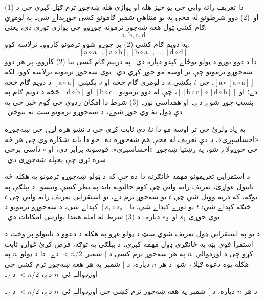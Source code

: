 \documentclass[../../../include/open-logic-section]{subfiles}
\begin{document}
دا تعريف راته وايي چې يو څيز هله او يوازې هله ښه‌جوړ
ترم ګڼل کېږي چې د (1) او~(2) دوو شرطونو له مخې په يو
متناهي شمېر ګامونو کښې جوړېداے شي۔ په لومړي ګام کښې
ټول هغه ښه‌جوړ ترمونه جوړوو چې يوازې تورې دي، يعنې:
\[
\mathrm{a}, \mathrm{b}, \mathrm{c}, \mathrm{d}
\]
په دويم ګام کښې (2) پر جوړو شوو ترمونو کاروو۔ ترلاسه کوو:
\[
[\mathrm{a} \circ \mathrm{a}], [\mathrm{a} \circ \mathrm{b}],
[\mathrm{b} \circ \mathrm{a}], \dots, [\mathrm{d} \circ \mathrm{d}]
\]
دا د دوو تورو د ټولو يوځاے کېدو دپاره دي۔ په درېيم ګام
کښې بيا (2) کاروو، پر هر دوو ښه‌جوړو ترمونو چې تر اوسه
مو جوړ کړي دي۔ نوي ښه‌جوړ ترمونه ترلاسه کوو، لکه
$[\mathrm{a} \circ [\mathrm{a} \circ
    \mathrm{a}]]$، چې $t$ پکښې $\mathrm{a}$ د لومړي ګام
څخه او $s$ پکښې $[\mathrm{a} \circ \mathrm{a}]$ د دويم
ګام څخه دے؛ او $[[\mathrm{b} \circ
    \mathrm{c}] \circ [\mathrm{d} \circ \mathrm{b}]]$، چې
له دوو ترمونو $[\mathrm{b} \circ \mathrm{c}]$ او $[\mathrm{d}
  \circ \mathrm{b}]$ څخه د دويم ګام په بنسټ جوړ شوے دے۔
او همداسې نور۔ (3) شرط دا امکان ردوي چې کوم څيز چې
په دې ډول نۀ وي جوړ شوے، د ښه‌جوړو ترمونو سټ ته ننوځي۔

په ياد ولرئ چې تر اوسه مو دا نۀ دي ثابت کړي چې د نښو
هره لړۍ چې ښه‌جوړه «احساسېږي»، د دې تعريف له مخې هم
ښه‌جوړه ده۔ خو دا بايد ښکاره وي چې هر څه چې جوړولاے
شو، په رښتيا ښه‌جوړ «احساسېږي»: قوسونه برابر دي، او
$\circ$ داسې برخې سره تړي چې پخپله ښه‌جوړې دي۔

د استقرايي تعريفونو مهمه ځانګړنه دا ده چې که د ټولو
ښه‌جوړو ترمونو په هکله څه ثابتول غواړئ، تعريف راته
وايي چې کوم حالتونه بايد په نظر کښې ونيسو۔ د بېلګې
په توګه، که درته وويل شي چې $t$ يو ښه‌جوړ ترم دے، نو
استقرايي تعريف راته وايي چې $t$ څنګه کېداے شي: $t$
يو تورے کېداے شي، يا $[s_1 \circ s_2]$ کېداے شي، د
ښه‌جوړو ترمونو د يوې جوړې $s_1$ او~$s_2$ دپاره۔ د
(3) شرط له امله همدا يوازيني امکانات دي۔

د يو په استقرايي ډول تعريف شوي سټ د ټولو غړو په هکله
د دعوو د ثابتولو پر وخت د استقرا قوي بڼه په ځانګړي
ډول مهمه کېږي۔ د بېلګې په توګه، فرض کړئ غواړو ثابت
کړو چې د اوږدوالي~$n$ په هر ښه‌جوړ ترم کښې د $[$
شمېر~$< n/2$ دے۔ دا د ټولو~$n$ په هکله يوه دعوه
ګڼلاے شو: د هر $n$ دپاره، د $[$ شمېر په هر هغه
ښه‌جوړ ترم کښې چې اوږدوالے ئې~$n$ دے، $< n/2$ دے۔

\begin{prop}
د هر $n$ دپاره، د $[$ شمېر په هغه ښه‌جوړ ترم کښې چې
اوږدوالے ئې~$n$ دے، $< n/2$ دے۔
\end{prop}
\end{document}
